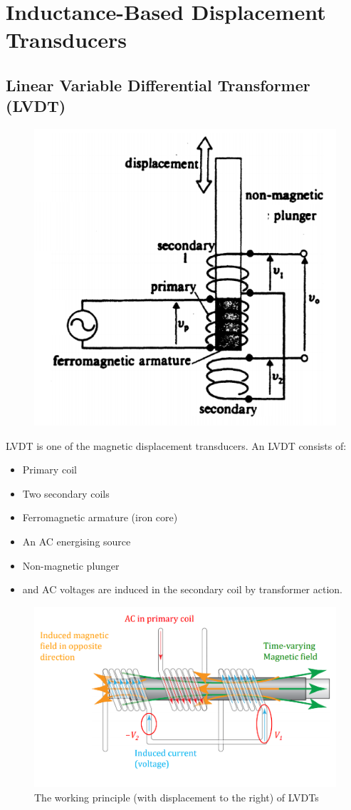 \documentclass[class=report, crop=false, 12pt,a4paper]{standalone}
\begin{document}
\section{Inductance-Based Displacement Transducers}
\subsection{Linear Variable Differential Transformer (LVDT)}
\begin{figure}[H]
  \centering
  \includegraphics[width = 0.5 \textwidth]{../img/Mdiagram8.PNG}
\end{figure}
LVDT is one of the magnetic displacement transducers. An LVDT consists of:
\begin{itemize}
  \item Primary coil
  \item Two secondary coils
  \item Ferromagnetic armature (iron core)
  \item An AC energising source
  \item Non-magnetic plunger
  \item and AC voltages are induced in the secondary coil by transformer action.
\end{itemize}
\begin{figure}[H]
  \centering
  \includegraphics[width = 0.85 \textwidth]{../img/Mdiagram9.PNG}
  \caption{The working principle (with displacement to the right) of LVDTs}
\end{figure}
\end{document}

